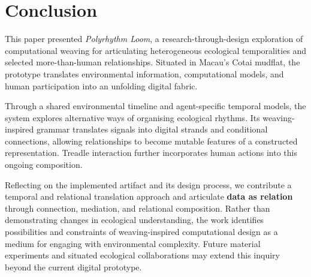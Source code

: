 \documentclass[manuscript,review,anonymous]{acmart}
\begin{document}
\section{Conclusion}

This paper presented \emph{Polyrhythm Loom}, a research-through-design exploration of computational weaving for articulating heterogeneous ecological temporalities and selected more-than-human relationships. Situated in Macau's Cotai mudflat, the prototype translates environmental information, computational models, and human participation into an unfolding digital fabric.

Through a shared environmental timeline and agent-specific temporal models, the system explores alternative ways of organising ecological rhythms. Its weaving-inspired grammar translates signals into digital strands and conditional connections, allowing relationships to become mutable features of a constructed representation. Treadle interaction further incorporates human actions into this ongoing composition.

Reflecting on the implemented artifact and its design process, we contribute a temporal and relational translation approach and articulate \textbf{data as relation} through connection, mediation, and relational composition. Rather than demonstrating changes in ecological understanding, the work identifies possibilities and constraints of weaving-inspired computational design as a medium for engaging with environmental complexity. Future material experiments and situated ecological collaborations may extend this inquiry beyond the current digital prototype.



\end{document}

